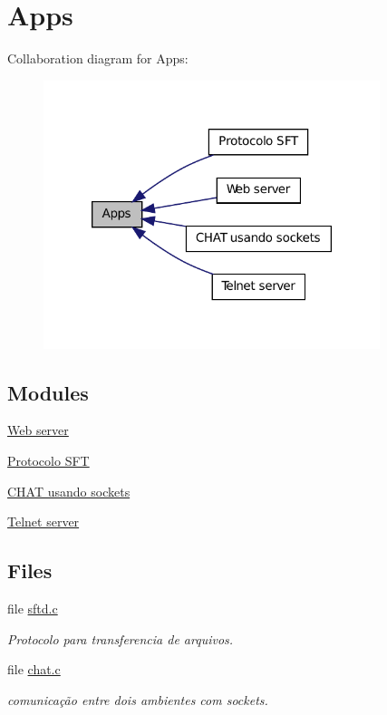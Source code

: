 \hypertarget{group__apps}{
\section{Apps}
\label{group__apps}
}


Collaboration diagram for Apps:
\nopagebreak
\begin{figure}[H]
\begin{center}
\leavevmode
\includegraphics[width=278pt]{group__apps}
\end{center}
\end{figure}


\subsection*{Modules}
\begin{DoxyCompactItemize}
\item 
\hyperlink{group__httpd}{Web server}
\item 
\hyperlink{group__SFTD}{Protocolo SFT}
\item 
\hyperlink{group__CHAT}{CHAT usando sockets}
\item 
\hyperlink{group__telnetd}{Telnet server}
\end{DoxyCompactItemize}
\subsection*{Files}
\begin{DoxyCompactItemize}
\item 
file \hyperlink{sftd_8c}{sftd.c}


\begin{DoxyCompactList}\small\item\em Protocolo para transferencia de arquivos. \item\end{DoxyCompactList}

\item 
file \hyperlink{chat_8c}{chat.c}


\begin{DoxyCompactList}\small\item\em comunicação entre dois ambientes com sockets. \item\end{DoxyCompactList}

\end{DoxyCompactItemize}
